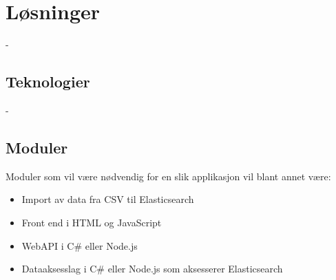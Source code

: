 \chapter{Løsninger}
-


\section{Teknologier}
-


\section{Moduler}
Moduler som vil være nødvendig for en slik applikasjon vil blant annet være:
\begin{itemize}
\item Import av data fra CSV til Elasticsearch
\item Front end i HTML og JavaScript
\item WebAPI i C\# eller Node.js
\item Dataaksesslag i C\# eller Node.js som aksesserer Elasticsearch
\end{itemize}

